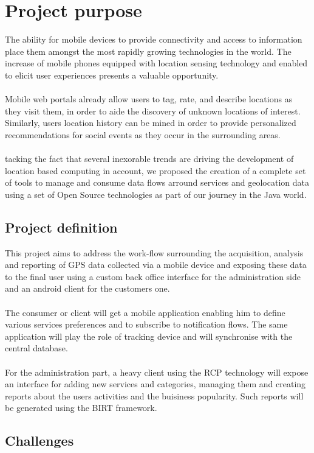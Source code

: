 
\section{Project purpose}
The ability for mobile devices to provide connectivity and access to information
place them amongst the most rapidly growing technologies in the world. The
increase of mobile phones equipped with location sensing technology and enabled
to elicit user experiences presents a valuable opportunity.
\\
\\
Mobile web portals already allow users to tag, rate, and describe locations as
they visit them, in order to aide the discovery of unknown locations of
interest. Similarly, users location history can be mined in order to provide
personalized recommendations for social events as they occur in the surrounding areas.
\\
\\
tacking the fact that several inexorable trends are driving the development of
location based computing in account, we proposed the creation of a complete
set of tools to manage and consume data flows arround services and geolocation
data using a set of Open Source technologies as part of our journey in the Java
world.

\subsection{Project definition}
This project aims to address the work-flow surrounding the acquisition, analysis
and reporting of GPS data collected via a mobile device and exposing these data
to the final user using a custom back office interface for the administration
side and an android client for the customers one.
\\
\\
The consumer or client will get a mobile application enabling him to define
various services preferences and to subscribe to notification flows. The same
application will play the role of tracking device and will synchronise with the
central database.
\\
\\
For the administration part, a heavy client using the RCP technology will expose
an interface for adding new services and categories, managing them and creating
reports about the users activities and the buisiness popularity. Such reports
will be generated using the BIRT framework.

\subsection{Challenges}
